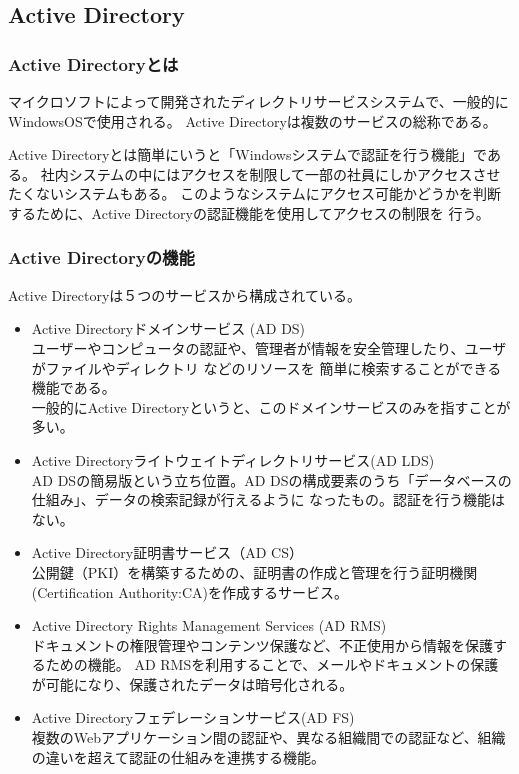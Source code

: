 \documentclass[12pt,a4paper,titlepage]{jsarticle}
\begin{document}
\subsection{Active Directory}
\subsubsection*{Active Directoryとは}
マイクロソフトによって開発されたディレクトリサービスシステムで、一般的にWindowsOSで使用される。
Active Directoryは複数のサービスの総称である。


Active Directoryとは簡単にいうと「Windowsシステムで認証を行う機能」である。
社内システムの中にはアクセスを制限して一部の社員にしかアクセスさせたくないシステムもある。
このようなシステムにアクセス可能かどうかを判断するために、Active Directoryの認証機能を使用してアクセスの制限を
行う。

\subsubsection*{Active Directoryの機能}

Active Directoryは５つのサービスから構成されている。

\begin{itemize}
    \item  Active Directoryドメインサービス (AD DS)\mbox{}\\
    ユーザーやコンピュータの認証や、管理者が情報を安全管理したり、ユーザがファイルやディレクトリ などのリソースを
    簡単に検索することができる機能である。\\
    一般的にActive Directoryというと、このドメインサービスのみを指すことが多い。
    
    \item Active Directoryライトウェイトディレクトリサービス(AD LDS)\mbox{}\\
    AD DSの簡易版という立ち位置。AD DSの構成要素のうち「データベースの仕組み」、データの検索記録が行えるように
    なったもの。認証を行う機能はない。

    \item Active Directory証明書サービス（AD CS）\mbox{}\\
    公開鍵（PKI）を構築するための、証明書の作成と管理を行う証明機関(Certification Authority:CA)を作成するサービス。
    
    \item Active Directory Rights Management Services (AD RMS)\mbox{}\\
    ドキュメントの権限管理やコンテンツ保護など、不正使用から情報を保護するための機能。
    AD RMSを利用することで、メールやドキュメントの保護が可能になり、保護されたデータは暗号化される。

    \item Active Directoryフェデレーションサービス(AD FS)\mbox{}\\
    複数のWebアプリケーション間の認証や、異なる組織間での認証など、組織の違いを超えて認証の仕組みを連携する機能。


\end{itemize}
\end{document}
